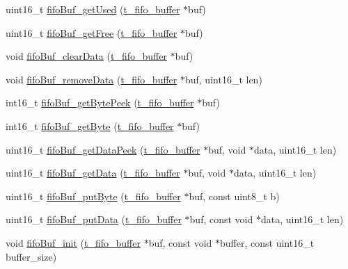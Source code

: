 \begin{DoxyCompactItemize}
\item 
uint16\-\_\-t \hyperlink{group___tau_labs_libraries_gaf7899f5644ee92bfeb70f13ce6960397}{fifo\-Buf\-\_\-get\-Used} (\hyperlink{structt__fifo__buffer}{t\-\_\-fifo\-\_\-buffer} $\ast$buf)
\item 
uint16\-\_\-t \hyperlink{group___tau_labs_libraries_ga844ca11f0130068bc86cbcafeb4b4ed5}{fifo\-Buf\-\_\-get\-Free} (\hyperlink{structt__fifo__buffer}{t\-\_\-fifo\-\_\-buffer} $\ast$buf)
\item 
void \hyperlink{group___tau_labs_libraries_ga9b8f79febf2799987381e0ebf46f3340}{fifo\-Buf\-\_\-clear\-Data} (\hyperlink{structt__fifo__buffer}{t\-\_\-fifo\-\_\-buffer} $\ast$buf)
\item 
void \hyperlink{group___tau_labs_libraries_gad0f438c3b314276b428c8d53c8c092a5}{fifo\-Buf\-\_\-remove\-Data} (\hyperlink{structt__fifo__buffer}{t\-\_\-fifo\-\_\-buffer} $\ast$buf, uint16\-\_\-t len)
\item 
int16\-\_\-t \hyperlink{group___tau_labs_libraries_ga3c62c9926850173d22b4b30eb43e8e20}{fifo\-Buf\-\_\-get\-Byte\-Peek} (\hyperlink{structt__fifo__buffer}{t\-\_\-fifo\-\_\-buffer} $\ast$buf)
\item 
int16\-\_\-t \hyperlink{group___tau_labs_libraries_gaf13e89738afc15e35e037da8d7cad31c}{fifo\-Buf\-\_\-get\-Byte} (\hyperlink{structt__fifo__buffer}{t\-\_\-fifo\-\_\-buffer} $\ast$buf)
\item 
uint16\-\_\-t \hyperlink{group___tau_labs_libraries_ga5fccb0ff8f5982236052c0eb939b14c5}{fifo\-Buf\-\_\-get\-Data\-Peek} (\hyperlink{structt__fifo__buffer}{t\-\_\-fifo\-\_\-buffer} $\ast$buf, void $\ast$data, uint16\-\_\-t len)
\item 
uint16\-\_\-t \hyperlink{group___tau_labs_libraries_gabc2919ac07ca622ec4daf5cc3e0c9fee}{fifo\-Buf\-\_\-get\-Data} (\hyperlink{structt__fifo__buffer}{t\-\_\-fifo\-\_\-buffer} $\ast$buf, void $\ast$data, uint16\-\_\-t len)
\item 
uint16\-\_\-t \hyperlink{group___tau_labs_libraries_ga03ae690aa0295d5a6f5afcdfcdc9fdff}{fifo\-Buf\-\_\-put\-Byte} (\hyperlink{structt__fifo__buffer}{t\-\_\-fifo\-\_\-buffer} $\ast$buf, const uint8\-\_\-t b)
\item 
uint16\-\_\-t \hyperlink{group___tau_labs_libraries_ga2399b539ff485341dbe71ff2f8bc8c4c}{fifo\-Buf\-\_\-put\-Data} (\hyperlink{structt__fifo__buffer}{t\-\_\-fifo\-\_\-buffer} $\ast$buf, const void $\ast$data, uint16\-\_\-t len)
\item 
void \hyperlink{group___tau_labs_libraries_ga42b601965d761a66732c7ae8a43d62b4}{fifo\-Buf\-\_\-init} (\hyperlink{structt__fifo__buffer}{t\-\_\-fifo\-\_\-buffer} $\ast$buf, const void $\ast$buffer, const uint16\-\_\-t buffer\-\_\-size)

\end{DoxyCompactItemize}
